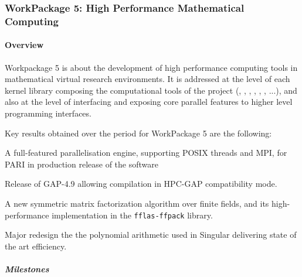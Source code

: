 \subsubsection{WorkPackage 5: High Performance Mathematical Computing}
  \label{hpc}


  \paragraph{Overview}

  Workpackage 5 is about the development of high performance computing tools in
  mathematical virtual research environments. It is addressed at the level
  of each kernel library composing the computational tools of the project (\Pari,
  \GAP, \Linbox, \MPIR, \Sage, \Singular, ...), and also at the level of interfacing and exposing
  core parallel features to higher level programming interfaces.

  Key results obtained over the period for WorkPackage 5 are the following:
  \begin{compactitem}
  \item A full-featured parallelisation engine, supporting POSIX threads and
  MPI, for PARI in production release of the software
  \item Release of GAP-4.9 allowing compilation  in HPC-GAP compatibility mode.
  \item A new symmetric matrix factorization algorithm over finite fields, and
  its high-performance implementation in the \texttt{fflas-ffpack} library.
  \item Major redesign the the polynomial arithmetic used in Singular delivering
  state of the art efficiency.
\end{compactitem}

\subparagraph{Milestones}

\subparagraph{}

